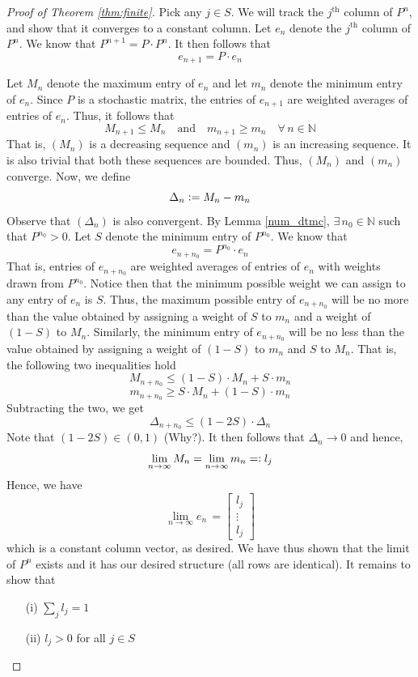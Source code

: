 \documentclass[12pt]{article}
\theoremstyle{definition}
\begin{document}
\begin{proof}[Proof of Theorem \ref{thm:finite}]
    Pick any $j \in S$. We will track the $j^{\text{th}}$ column of $P^n$, and show that it converges to a constant column. Let $e_n$ denote the $j^{\text{th}}$ column of $P^n$. We know that $P^{n+1} = P \cdot P^n$. It then follows that
    \[
        e_{n+1} = P \cdot e_n
    \]
    
    Let $M_n$ denote the maximum entry of $e_n$ and let $m_n$ denote the minimum entry of $e_n$. Since $P$ is a stochastic matrix, the entries of $e_{n+1}$ are weighted averages of entries of $e_n$. Thus, it follows that
    \[
        M_{n+1} \leq M_n \quad \text{and} \quad m_{n+1} \geq m_n \quad \forall \, n \in \mathbb{N}
    \]
    That is, $(M_n)$ is a decreasing sequence and $(m_n)$ is an increasing sequence. It is also trivial that both these sequences are bounded. Thus, $(M_n)$ and $(m_n)$ converge. Now, we define
    \[
        \Delta_n \vcentcolon= M_n - m_n
    \]
    Observe that $(\Delta_n)$ is also convergent. By Lemma \ref{num_dtmc}, $\exists \, n_0 \in \mathbb{N}$ such that $P^{n_0} > 0$. Let $S$ denote the minimum entry of $P^{n_0}$. We know that
    \[
        e_{n+n_0} = P^{n_0} \cdot e_n
    \]
    That is, entries of $e_{n+n_0}$ are weighted averages of entries of $e_n$ with weights drawn from $P^{n_0}$. Notice then that the minimum possible weight we can assign to any entry of $e_n$ is $S$. Thus, the maximum possible entry of $e_{n+n_0}$ will be no more than the value obtained by assigning a weight of $S$ to $m_n$ and a weight of $(1-S)$ to $M_n$. Similarly, the minimum entry of $e_{n+n_0}$ will be no less than the value obtained by assigning a weight of $(1-S)$ to $m_n$ and $S$ to $M_n$. That is, the following two inequalities hold
    \[
        M_{n+n_0} \leq (1-S) \cdot M_n + S \cdot m_n
    \]
    \[
        m_{n+n_0} \geq S \cdot M_n + (1-S) \cdot m_n
    \]
    Subtracting the two, we get
    \[
        \Delta_{n+n_0} \leq (1-2S) \cdot \Delta_n
    \]
    Note that $(1-2S) \in (0,1)$ (Why?). It then follows that $\Delta_n \to 0$ and hence,
    \[
        \lim_{n \to \infty} M_n = \lim_{n \to \infty} m_n =\vcentcolon l_j
    \]
    Hence, we have
    \[
        \lim_{n \to \infty} e_n \, = \begin{bmatrix}
            l_j \\ \vdots \\ l_j
        \end{bmatrix}
    \]
    which is a constant column vector, as desired. We have thus shown that the limit of $P^n$ exists and it has our desired structure (all rows are identical). It remains to show that 
    \begin{enumerate}
        \item[(i)] $\sum\limits_{j} l_j = 1$
        \item[(ii)] $l_j > 0$ for all $j \in S$
    \end{enumerate}
    

\end{proof}
\end{document}

